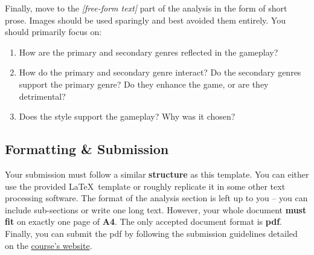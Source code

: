 \documentclass[a4paper,10pt,english]{article}
\newcommand{\ph}[1]{\textit{[#1]}}
\begin{document}
Finally, move to the \ph{free-form text} part of the analysis in the form of short prose. Images should be used sparingly and best avoided them entirely. You should primarily focus on: 
\begin{enumerate}
    \item How are the primary and secondary genres reflected in the gameplay?
    \item How do the primary and secondary genre interact? Do the secondary genres support the primary genre? Do they enhance the game, or are they detrimental?
    \item Does the style support the gameplay? Why was it chosen?
\end{enumerate}

\subsection*{Formatting \& Submission}

Your submission must follow a similar \textbf{structure} as this template. You can either use the provided \LaTeX\ template or roughly replicate it in some other text processing software. The format of the analysis section is left up to you -- you can include sub-sections or write one long text. However, your whole document \textbf{must fit} on exactly one page of \textbf{A4}. The only accepted document format is \textbf{pdf}. Finally, you can submit the pdf by following the submission guidelines detailed on the \href{http://cphoto.fit.vutbr.cz/ludo/courses/izhv/exercises/sub/}{course's website}.
\end{document}
